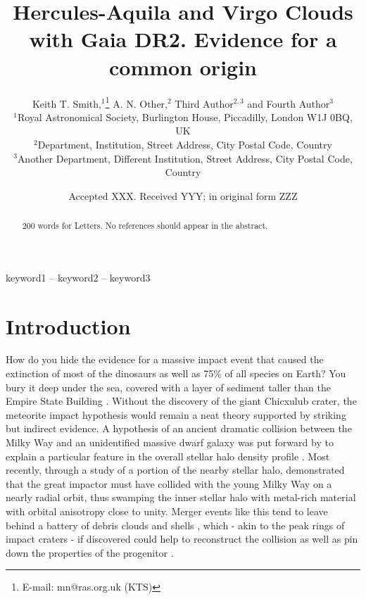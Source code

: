 \documentclass[fleqn,usenatbib]{mnras}
\title[Hercules-Aquila and Virgo Clouds with Gaia DR2]{Hercules-Aquila
  and Virgo Clouds with Gaia DR2. Evidence for a common origin}
\author[K. T. Smith et al.]{
Keith T. Smith,$^{1}$\thanks{E-mail: mn@ras.org.uk (KTS)}
A. N. Other,$^{2}$
Third Author$^{2,3}$
and Fourth Author$^{3}$
\\
$^{1}$Royal Astronomical Society, Burlington House, Piccadilly, London W1J 0BQ, UK\\
$^{2}$Department, Institution, Street Address, City Postal Code, Country\\
$^{3}$Another Department, Different Institution, Street Address, City Postal Code, Country
}
\date{Accepted XXX. Received YYY; in original form ZZZ}
\begin{document}
\label{firstpage}
\pagerange{\pageref{firstpage}--\pageref{lastpage}}
\maketitle

\begin{abstract}
200 words for Letters.
No references should appear in the abstract.
\end{abstract}

\begin{keywords}
keyword1 -- keyword2 -- keyword3
\end{keywords}



\section{Introduction}

How do you hide the evidence for a massive impact event that caused
the extinction of most of the dinosaurs as well as 75\% of all species
on Earth? You bury it deep under the sea, covered with a layer of
sediment taller than the Empire State Building
\citep[][]{Hildebrand1991}. Without the discovery of the giant
Chicxulub crater, the meteorite impact hypothesis would remain a neat
theory supported by striking but indirect evidence. A hypothesis of an
ancient dramatic collision between the Milky Way and an unidentified
massive dwarf galaxy was put forward by \citet{Deason2013} to explain
a particular feature in the overall stellar halo density profile
\citep[][]{Wa09,De11}. Most recently, through a study of a portion of
the nearby stellar halo, \citet{Belokurov2018} demonstrated that the
great impactor must have collided with the young Milky Way on a nearly
radial orbit, thus swamping the inner stellar halo with metal-rich
material with orbital anisotropy \citep[see][]{Binney2008} close to
unity. Merger events like this tend to leave behind a battery of
debris clouds and shells \citep[see][]{Amorisco2015,Hendel2015}, which
- akin to the peak rings of impact craters \citep[see
  e.g.][]{Morgan2016} - if discovered could help to reconstruct the
collision as well as pin down the properties of the progenitor
\citep[e.g][]{Sanderson2013,Johnston2016}.
\end{document}
